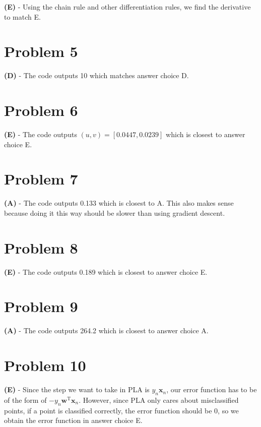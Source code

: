 \documentclass[10pt,letter]{article}
\begin{document}
\textbf{(E)} - Using the chain rule and other differentiation rules, we find the derivative to match E.

\section*{Problem 5}

\textbf{(D)} - The code outputs 10 which matches answer choice D.

\section*{Problem 6}

\textbf{(E)} - The code outputs $(u,v) = [0.0447, 0.0239]$ which is closest to answer choice E.

\section*{Problem 7}

\textbf{(A)} - The code outputs 0.133 which is closest to A. This also makes sense because doing it this way should be slower than using gradient descent.

\section*{Problem 8}

\textbf{(E)} - The code outputs 0.189 which is closest to answer choice E. 

\section*{Problem 9}

\textbf{(A)} - The code outputs 264.2 which is closest to answer choice A.

\section*{Problem 10}

\textbf{(E)} - Since the step we want to take in PLA is $y_n \boldsymbol{x}_n$, our error function has to be of the form of $-y_n \boldsymbol{w}^\textrm{T}\boldsymbol{x}_n$. However, since PLA only cares about misclassified points, if a point is classified correctly, the error function should be 0, so we obtain the error function in answer choice E.
\end{document}
